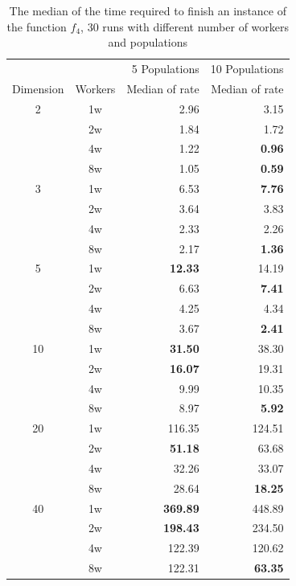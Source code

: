 \documentclass[review]{elsarticle}
\begin{document}
%
\begin{table}[]
  \caption{The median of the time required to finish an instance of the function $f_4$, 30 runs
  with different number of workers and populations} %
  \label{tab:time}
  \vspace{0.25cm}
    \centering
    \begin{tabular}{ccrr}
    \hline
              &         & 5 Populations    & 10 Populations \\
     Dimension& Workers & Median of rate & Median of rate  \\
    \hline
          2   & 1w      & 2.96   & 3.15   \\
              & 2w      & 1.84   & 1.72   \\
              & 4w      & 1.22   & \textbf{0.96}   \\
              & 8w      & 1.05   & \textbf{0.59}   \\
    \hline
          3   & 1w      & 6.53   & \textbf{7.76}   \\
              & 2w      & 3.64   & 3.83   \\
              & 4w      & 2.33   & 2.26   \\
              & 8w      & 2.17   &  \textbf{1.36}   \\
    \hline
          5   & 1w      & \textbf{12.33}  & 14.19  \\
              & 2w      & 6.63   & \textbf{7.41}   \\
              & 4w      & 4.25   & 4.34   \\
              & 8w      & 3.67   &  \textbf{2.41}   \\
    \hline
          10  & 1w      & \textbf{31.50}  & 38.30  \\
              & 2w      & \textbf{16.07}  & 19.31  \\
              & 4w      &  9.99   & 10.35  \\
              & 8w      & 8.97   &  \textbf{5.92}  \\
    \hline
          20  & 1w      &  116.35 & 124.51 \\
              & 2w      & \textbf{51.18}  & 63.68  \\
              & 4w      & 32.26  & 33.07  \\
              & 8w      & 28.64  & \textbf{18.25}  \\
    \hline
          40  & 1w      & \textbf{369.89} & 448.89 \\
              & 2w      & \textbf{198.43} & 234.50 \\
              & 4w      & 122.39 &  120.62 \\
              & 8w      & 122.31 & \textbf{63.35} \\
    \hline
  \end{tabular}
\end{table}
\end{document}
